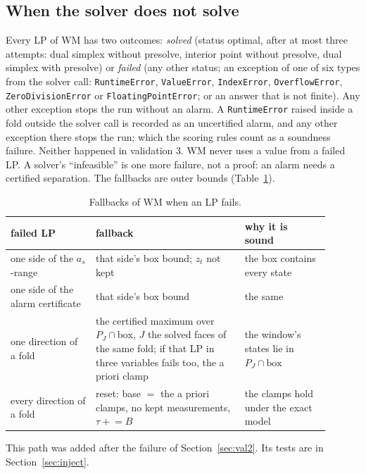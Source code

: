 \subsection{When the solver does not solve}\label{sec:fallback}

Every LP of WM has two outcomes: \emph{solved} (status optimal, after at most three attempts: dual simplex without
presolve, interior point without presolve, dual simplex with presolve) or \emph{failed} (any other status; an exception
of one of six types from the solver call: \texttt{RuntimeError}, \texttt{ValueError}, \texttt{IndexError},
\texttt{OverflowError}, \texttt{ZeroDivisionError} or \texttt{FloatingPointError}; or an answer that is not finite).
Any other exception stops the run without an alarm. A \texttt{RuntimeError} raised inside a fold outside the solver
call is recorded as an uncertified alarm, and any other exception there stops the run; which the scoring rules count as a soundness failure. Neither happened in validation 3. WM never uses a value from a failed LP. A solver's
``infeasible'' is one more failure, not a proof: an alarm needs a certified separation. The fallbacks are outer bounds
(Table~\ref{tab:fallback}).

\begin{table}[t]
\centering\small
\caption{Fallbacks of WM when an LP fails.}\label{tab:fallback}
\begin{tabular}{>{\raggedright}p{0.24\linewidth}>{\raggedright}p{0.42\linewidth}>{\raggedright\arraybackslash}p{0.24\linewidth}}
\toprule
failed LP & fallback & why it is sound\\
\midrule
one side of the $a_s$-range & that side's box bound; $z_t$ not kept & the box contains every state\\
one side of the alarm certificate & that side's box bound & the same\\
one direction of a fold & the certified maximum over $P_J\cap\text{box}$, $J$ the solved faces of the same fold; if
that LP in three variables fails too, the a priori clamp & the window's states lie in $P_J\cap\text{box}$\\
every direction of a fold & reset: base $=$ the a priori clamps, no kept measurements, $\tau \mathrel{+}= B$ & the
clamps hold under the exact model\\
\bottomrule
\end{tabular}
\end{table}

This path was added after the failure of Section~\ref{sec:val2}. Its tests are in Section~\ref{sec:inject}.

